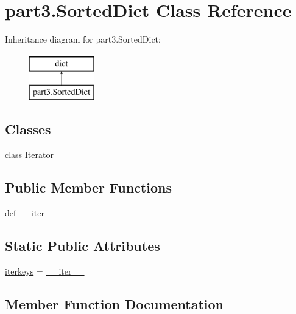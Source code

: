 \hypertarget{classpart3_1_1SortedDict}{}\section{part3.\+Sorted\+Dict Class Reference}
\label{classpart3_1_1SortedDict}
Inheritance diagram for part3.\+Sorted\+Dict\+:\begin{figure}[H]
\begin{center}
\leavevmode
\includegraphics[height=2.000000cm]{classpart3_1_1SortedDict}
\end{center}
\end{figure}
\subsection*{Classes}
\begin{DoxyCompactItemize}
\item 
class \hyperlink{classpart3_1_1SortedDict_1_1Iterator}{Iterator}
\end{DoxyCompactItemize}
\subsection*{Public Member Functions}
\begin{DoxyCompactItemize}
\item 
def \hyperlink{classpart3_1_1SortedDict_aa3bcb8ad7792e5220a83447ac4fe0f7f}{\+\_\+\+\_\+iter\+\_\+\+\_\+}
\end{DoxyCompactItemize}
\subsection*{Static Public Attributes}
\begin{DoxyCompactItemize}
\item 
\hyperlink{classpart3_1_1SortedDict_a90554f3125d7efe000cfb234368fe94e}{iterkeys} = \hyperlink{classpart3_1_1SortedDict_aa3bcb8ad7792e5220a83447ac4fe0f7f}{\+\_\+\+\_\+iter\+\_\+\+\_\+}
\end{DoxyCompactItemize}


\subsection{Member Function Documentation}
\hypertarget{classpart3_1_1SortedDict_aa3bcb8ad7792e5220a83447ac4fe0f7f}{}
